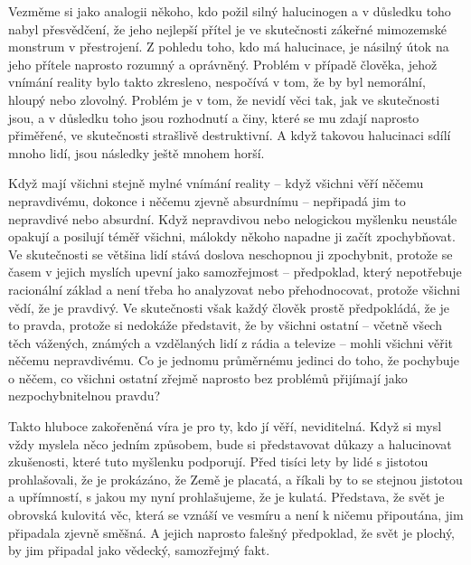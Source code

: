 \documentclass{book}
\begin{document}
Vezměme si jako analogii někoho, kdo požil silný halucinogen a v důsledku toho nabyl přesvědčení, že jeho nejlepší přítel je ve skutečnosti zákeřné mimozemské monstrum v přestrojení. Z pohledu toho, kdo má halucinace, je násilný útok na jeho přítele naprosto rozumný a oprávněný. Problém v případě člověka, jehož vnímání reality bylo takto zkresleno, nespočívá v tom, že by byl nemorální, hloupý nebo zlovolný. Problém je v tom, že nevidí věci tak, jak ve skutečnosti jsou, a v důsledku toho jsou rozhodnutí a činy, které se mu zdají naprosto přiměřené, ve skutečnosti strašlivě destruktivní. A když takovou halucinaci sdílí mnoho lidí, jsou následky ještě mnohem horší.

Když mají všichni stejně mylné vnímání reality -- když všichni věří něčemu nepravdivému, dokonce i něčemu zjevně absurdnímu -- nepřipadá jim to nepravdivé nebo absurdní. Když nepravdivou nebo nelogickou myšlenku neustále opakují a posilují téměř všichni, málokdy někoho napadne ji začít zpochybňovat. Ve skutečnosti se většina lidí stává doslova neschopnou ji zpochybnit, protože se časem v jejich myslích upevní jako samozřejmost -- předpoklad, který nepotřebuje racionální základ a není třeba ho analyzovat nebo přehodnocovat, protože všichni vědí, že je pravdivý. Ve skutečnosti však každý člověk prostě předpokládá, že je to pravda, protože si nedokáže představit, že by všichni ostatní -- včetně všech těch vážených, známých a vzdělaných lidí z rádia a televize -- mohli všichni věřit něčemu nepravdivému. Co je jednomu průměrnému jedinci do toho, že pochybuje o něčem, co všichni ostatní zřejmě naprosto bez problémů přijímají jako nezpochybnitelnou pravdu?

Takto hluboce zakořeněná víra je pro ty, kdo jí věří, neviditelná. Když si mysl vždy myslela něco jedním způsobem, bude si představovat důkazy a halucinovat zkušenosti, které tuto myšlenku podporují. Před tisíci lety by lidé s jistotou prohlašovali, že je prokázáno, že Země je placatá, a říkali by to se stejnou jistotou a upřímností, s jakou my nyní prohlašujeme, že je kulatá. Představa, že svět je obrovská kulovitá věc, která se vznáší ve vesmíru a není k ničemu připoutána, jim připadala zjevně směšná. A jejich naprosto falešný předpoklad, že svět je plochý, by jim připadal jako vědecký, samozřejmý fakt.
\end{document}
